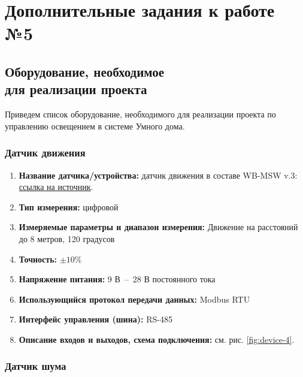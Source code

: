 \documentclass[a4paper,14pt]{extarticle}
\begin{document}
\newpage

\section{Дополнительные задания к работе №5}

\subsection{Оборудование, необходимое \\для реализации проекта}
Приведем список оборудование, необходимого для реализации проекта по управлению освещением в системе Умного дома.

\subsubsection*{Датчик движения}


\begin{enumerate}
	\item \textbf{Название датчика/устройства:} датчик движения в составе WB-MSW v.3: \href{https://wirenboard.com/ru/product/wb-msw-v3}{ссылка на источник}.
	
	\item \textbf{Тип измерения:} цифровой
	
	\item  \textbf{Измеряемые параметры и диапазон измерения:}  Движение на расстояний до 8 метров, 120 градусов
	
	\item  \textbf{Точность:} $\pm10 \%$	
	\item  \textbf{Напряжение питания:} 9 В~--~28 В постоянного тока
	
	\item  \textbf{Использующийся протокол передачи данных:} Modbus RTU
	
	\item  \textbf{Интерфейс управления (шина):} RS-485
	
	\item  \textbf{Описание входов и выходов, схема подключения:} см. рис. \ref{fig:device-4}.
\end{enumerate}


\subsubsection*{Датчик шума}
\end{document}
